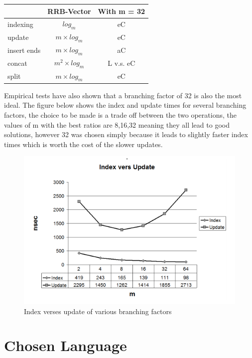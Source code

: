 \documentclass[11pt,a4paper,oneside]{article}
\begin{document}
	\begin{center}
	\begin{tabular}{| l || c | c |}
		\hline
		& RRB-Vector & With m = 32 \\
		\hline
		indexing & $ log_m $ & eC\\
		update & $m \times log_m $ & eC \\
		insert ends & $ m \times log_m $ & aC \\
		concat & $ m^2 \times log_m $ & L v.s. eC \\
		split & $ m \times log_m $ & eC \\
		\hline
		\end{tabular}
	\end{center}

Empirical tests have also shown that a branching factor of 32 is also the most ideal. The figure below shows the index and update times for several branching factors, the choice to be made is a trade off between the two operations, the values of m with the best ratios are 8,16,32 meaning they all lead to good solutions, however 32 was chosen simply because it leads to slightly faster index times which is worth the cost of the slower updates.

\begin{figure}[H]
	\centering
	\includegraphics[scale=0.5]{img/indexupdate.png}
	\caption{Index verses update of various branching factors\citep{bagwell2011rrb}}
\end{figure}

\section{Chosen Language}
\end{document}
